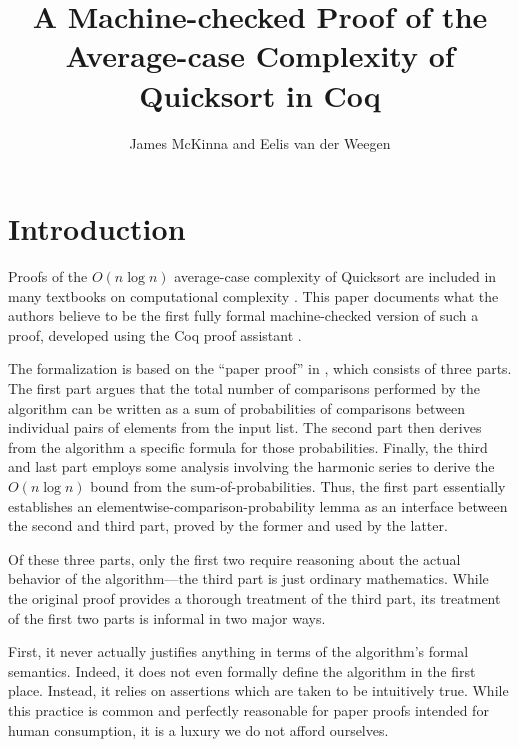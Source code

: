 \documentclass[runningheads]{llncs}
\newcommand{\theauthors}{James McKinna and Eelis van der Weegen}
\newcommand{\thetitle}{A Machine-checked Proof of the Average-case Complexity of Quicksort in Coq}
\begin{document}
\nocite{*}

\title{\thetitle}

\authorrunning{\em}
\titlerunning{\em}

\author{\theauthors}


\maketitle

\begin{abstract}
  
\end{abstract}

\section{Introduction}

Proofs of the $O(n \log n)$ average-case complexity of Quicksort \cite{HoareQuick} are included in many textbooks on computational complexity \cite[for example]{introtoalgos}.
This paper documents what the authors believe to be the first fully formal machine-checked version of such a proof, developed using the Coq proof assistant \cite{coq}.

The formalization is based on the ``paper proof'' in \cite{introtoalgos}, which consists of three parts. The first part argues that the total number of comparisons performed by the algorithm can be written as a sum of probabilities of comparisons between individual pairs of elements from the input list. The second part then derives from the algorithm a specific formula for those probabilities. Finally, the third and last part employs some analysis involving the harmonic series to derive the $O(n \log n)$ bound from the sum-of-probabilities. Thus, the first part essentially establishes an elementwise-comparison-probability lemma as an interface between the second and third part, proved by the former and used by the latter.

Of these three parts, only the first two require reasoning about the actual behavior of the algorithm---the third part is just ordinary mathematics. While the original proof provides a thorough treatment of the third part, its treatment of the first two parts is informal in two major ways.

First, it never actually justifies anything in terms of the algorithm's formal semantics. Indeed, it does not even formally define the algorithm in the first place. Instead, it relies on assertions which are taken to be intuitively true. While this practice is common and perfectly reasonable for paper proofs intended for human consumption, it is a luxury we do not afford ourselves.
\end{document}
